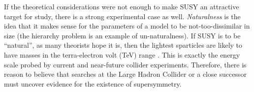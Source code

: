 If the theoretical considerations were not enough to make SUSY an
attractive target for study, there is a strong experimental case as
well. \emph{Naturalness} is the idea that it makes sense for the
parameters of a model to be not-too-dissimilar in size (the hierarchy
problem is an example of un-naturalness). If SUSY is
to be ``natural'', as many theorists hope it is, then the lightest
sparticles are likely to have masses in the terra-electron volt (TeV)
range \cite{susydarkmatter,susyprimer}. This is exactly the energy
scale probed by current and near-future collider experiments.
Therefore, there is reason to believe that searches at the Large Hadron
Collider or a close successor must uncover evidence for the existence
of supersymmetry.
